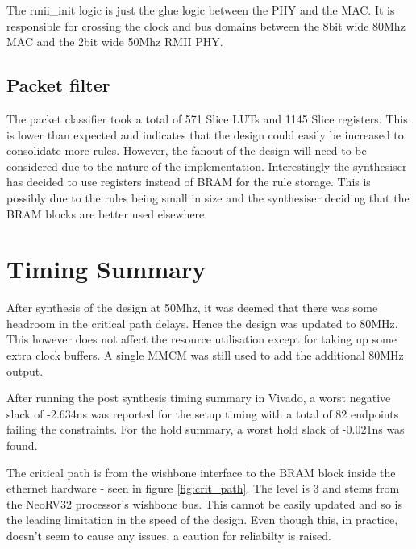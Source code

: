 The rmii\_init logic is just the glue logic between the PHY and the MAC. It is responsible for crossing the clock and bus domains between the 8bit wide 80Mhz MAC and the 2bit wide 50Mhz RMII PHY. 



\subsection{Packet filter}
The packet classifier took a total of 571 Slice LUTs and 1145 Slice registers. This is lower than expected and indicates that the design could easily be increased to consolidate more rules. However, the fanout of the design will need to be considered due to the nature of the implementation. Interestingly the synthesiser has decided to use registers instead of BRAM for the rule storage. This is possibly due to the rules being small in size and the synthesiser deciding that the BRAM blocks are better used elsewhere.











\section{Timing Summary}
\label{sec:timing_summary}

After synthesis of the design at 50Mhz, it was deemed that there was some headroom in the critical path delays. Hence the design was updated to 80MHz. This however does not affect the resource utilisation except for taking up some extra clock buffers. A single MMCM was still used to add the additional 80MHz output. 





After running the post synthesis timing summary in Vivado, a worst negative slack of -2.634ns was reported for the setup timing with a total of 82 endpoints failing the constraints. For the hold summary, a worst hold slack of -0.021ns was found. 

The critical path is from the wishbone interface to the BRAM block inside the ethernet hardware - seen in figure \ref{fig:crit_path}. The level is 3 and stems from the NeoRV32 processor's wishbone bus. This cannot be easily updated and so is the leading limitation in the speed of the design. Even though this, in practice, doesn't seem to cause any issues, a caution for reliabilty is raised. 


